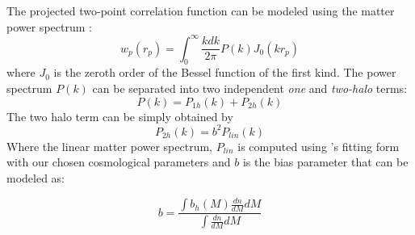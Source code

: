\documentclass[useAMS,usenatbib]{mn2e}
\begin{document}
The projected two-point correlation function can be modeled using the matter 
power spectrum \citep[see, e.g., ][]{cs02}:
\begin{equation}
w_{p}(r_p) = \int^{\infty}_{0} \frac{k dk}{2\pi} P(k) J_0(k r_p)
\end{equation}
where $J_0$ is the zeroth order of the Bessel function of the first kind. The power spectrum $P(k)$ can be separated into two independent {\it one} and {\it two-halo} terms: 
\begin{equation}
  P(k) = P_{1h}(k)+P_{2h}(k)
\end{equation}
The two halo term can be simply obtained by  
\begin{equation}
P_{2h}(k) = b^2 P_{lin}(k)
\end{equation}
Where the linear matter power spectrum, $P_{lin}$ is computed using 
\citet{eh99}'s fitting form with our chosen cosmological parameters and $b$ is 
the bias parameter that can be modeled as:

\begin{equation}
b = \frac{\int b_h(M) \frac{dn}{dM} dM}{\int \frac{dn}{dM} dM}
\end{equation}
\end{document}
